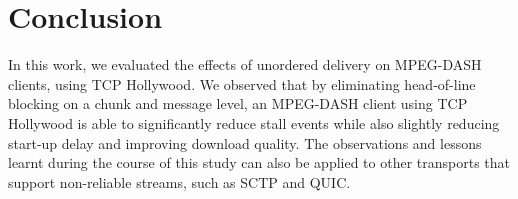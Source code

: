 \section{Conclusion}
\label{sec:conclusion}

In this work, we evaluated the effects of unordered delivery on MPEG-DASH clients, using TCP Hollywood. We
observed that by eliminating head-of-line blocking on a chunk and message level, 
an MPEG-DASH client using TCP
Hollywood is able to significantly reduce stall events while also slightly reducing start-up
delay and improving download quality. The observations and lessons learnt during the
course of this study can also be applied to other transports that support non-reliable
streams, such as SCTP and QUIC. 